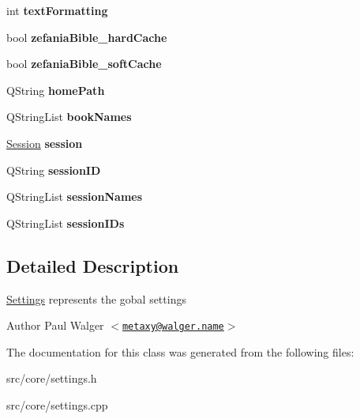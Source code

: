 \begin{DoxyCompactItemize}
\item 
\hypertarget{classSettings_a8ab9cbd065e446b65f9fbb4ce6f981a7}{
int {\bfseries textFormatting}}
\label{classSettings_a8ab9cbd065e446b65f9fbb4ce6f981a7}

\item 
\hypertarget{classSettings_a28f6c1d7cdf32e63ee846d0a837e5cb6}{
bool {\bfseries zefaniaBible\_\-hardCache}}
\label{classSettings_a28f6c1d7cdf32e63ee846d0a837e5cb6}

\item 
\hypertarget{classSettings_aef510dadba5c3c966cff5d5175c47e7f}{
bool {\bfseries zefaniaBible\_\-softCache}}
\label{classSettings_aef510dadba5c3c966cff5d5175c47e7f}

\item 
\hypertarget{classSettings_a28469cd69cee24a26821011fa375508b}{
QString {\bfseries homePath}}
\label{classSettings_a28469cd69cee24a26821011fa375508b}

\item 
\hypertarget{classSettings_ab062343977a2a1ca8c42e48aee4b6948}{
QStringList {\bfseries bookNames}}
\label{classSettings_ab062343977a2a1ca8c42e48aee4b6948}

\item 
\hypertarget{classSettings_a23b665ea874d013c50f77e424ea55870}{
\hyperlink{classSession}{Session} {\bfseries session}}
\label{classSettings_a23b665ea874d013c50f77e424ea55870}

\item 
\hypertarget{classSettings_aad58627ef312ee3f5a97a2beedee830b}{
QString {\bfseries sessionID}}
\label{classSettings_aad58627ef312ee3f5a97a2beedee830b}

\item 
\hypertarget{classSettings_abf2c62c50a25ea136ea630c3cc645cb4}{
QStringList {\bfseries sessionNames}}
\label{classSettings_abf2c62c50a25ea136ea630c3cc645cb4}

\item 
\hypertarget{classSettings_a2ed9f34aef99c8c0c719c1ae98dee2dc}{
QStringList {\bfseries sessionIDs}}
\label{classSettings_a2ed9f34aef99c8c0c719c1ae98dee2dc}

\end{DoxyCompactItemize}


\subsection{Detailed Description}
\hyperlink{classSettings}{Settings} represents the gobal settings

\begin{DoxyAuthor}{Author}
Paul Walger $<$\href{mailto:metaxy@walger.name}{\tt metaxy@walger.name}$>$ 
\end{DoxyAuthor}


The documentation for this class was generated from the following files:\begin{DoxyCompactItemize}
\item 
src/core/settings.h\item 
src/core/settings.cpp\end{DoxyCompactItemize}
